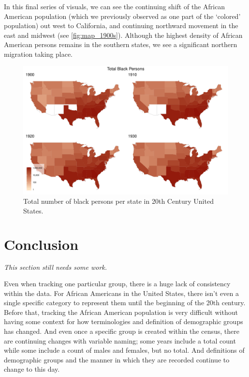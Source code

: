 \documentclass[DIV=calc, paper=a4, fontsize=10pt, twocolumn]{scrartcl}\usepackage[]{graphicx}\usepackage[]{color}
\newenvironment{knitrout}{}{} %
\begin{document}
\par In this final series of visuals, we can see the continuing shift of the African American population (which we previously observed as one part of the `colored' population) out west to California, and continuing northward movement in the east and midwest (see \autoref{fig:map_1900s}). Although the highest density of African American persons remains in the southern states, we see a significant northern migration taking place. 


\begin{knitrout}
\color{fgcolor}\begin{figure}[h]
\includegraphics[width=.5\textwidth]{figure/map_1900s-1} \caption[Total number of black persons per state in 20th Century United States]{Total number of black persons per state in 20th Century United States.}\label{fig:map_1900s}
\end{figure}


\end{knitrout}




\section*{Conclusion}

\par \textit{This section still needs some work.}

\par Even when tracking one particular group, there is a huge lack of consistency within the data. For African Americans in the United States, there isn't even a single specific category to represent them until the beginning of the 20th century. Before that, tracking the African American population is very difficult without having some context for how terminologies and definition of demographic groups has changed. And even once a specific group is created within the census, there are continuing changes with variable naming; some years include a total count while some include a count of males and females, but no total. And definitions of demographic groups and the manner in which they are recorded continue to change to this day. 
\end{document}
